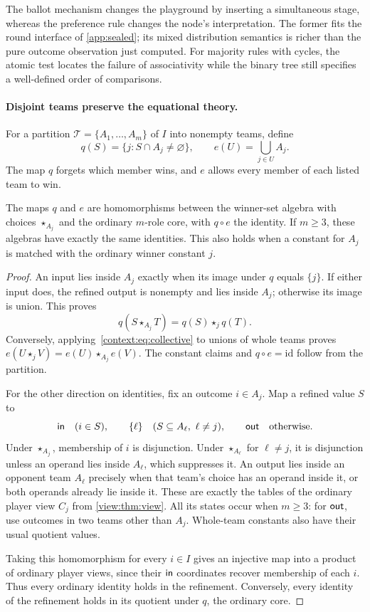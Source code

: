 The ballot mechanism changes the playground by inserting a simultaneous
stage, whereas the preference rule changes the node's interpretation.
The former fits the round interface of \cref{app:sealed}; its mixed
distribution semantics is richer than the pure outcome observation
just computed. For majority rules with cycles, the atomic test locates
the failure of associativity while the binary tree still specifies a
well-defined order of comparisons.

\paragraph{Disjoint teams preserve the equational theory.}
For a partition $\mathcal T=\{A_1,\ldots,A_m\}$ of $I$ into nonempty
teams, define
\[
 q(S)=\{j:S\cap A_j\ne\varnothing\},\qquad
 e(U)=\bigcup_{j\in U}A_j.
\]
The map $q$ forgets which member wins, and $e$ allows every member of
each listed team to win.

\begin{proposition}\label{context:prop:team-refinement}
The maps $q$ and $e$ are homomorphisms between the winner-set algebra
with choices $\star_{A_j}$ and the ordinary $m$-role core, with
$q\circ e$ the identity. If $m\geq3$, these
algebras have exactly the same identities. This also holds when a
constant for $A_j$ is matched with the ordinary winner constant $j$.
\end{proposition}
\begin{proof}
An input lies inside $A_j$ exactly when its image under $q$ equals
$\{j\}$. If either input does, the refined output is nonempty and
lies inside $A_j$; otherwise its image is union. This proves
\[
 q(S\star_{A_j}T)=q(S)\star_j q(T).
\]
Conversely, applying~\eqref{context:eq:collective} to unions of whole
teams proves $e(U\star_j V)=e(U)\star_{A_j}e(V)$.
The constant claims and $q\circ e=\mathrm{id}$ follow from the partition.

For the other direction on identities, fix an outcome $i\in A_j$.
Map a refined value $S$ to
\[
 \mathsf{in}\quad(i\in S),\qquad
 \{\ell\}\quad(S\subseteq A_\ell,\ \ell\ne j),\qquad
 \mathsf{out}\quad\text{otherwise}.
\]
Under $\star_{A_j}$, membership of $i$ is disjunction. Under
$\star_{A_\ell}$ for $\ell\ne j$, it is disjunction unless an
operand lies inside $A_\ell$, which suppresses it. An output lies
inside an opponent team $A_\ell$ precisely when that team's choice
has an operand inside it, or both operands already lie inside it.
These are exactly the tables of the ordinary player view $C_j$
from \cref{view:thm:view}. All its states occur when $m\geq3$:
for $\mathsf{out}$, use outcomes in two teams other than $A_j$.
Whole-team constants also have their usual quotient values.

Taking this homomorphism for every $i\in I$ gives an injective map
into a product of ordinary player views, since their $\mathsf{in}$ coordinates
recover membership of each $i$. Thus every ordinary identity holds
in the refinement. Conversely, every identity of the refinement
holds in its quotient under $q$, the ordinary core.
\end{proof}

